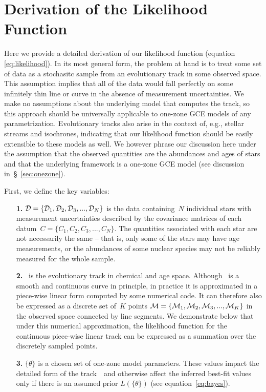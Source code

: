 \documentclass[ms.tex]{subfiles}
\begin{document}
\renewcommand\theequation{\thesection\arabic{equation}}
\renewcommand\thefigure{\thesection\arabic{figure}}
\setcounter{equation}{0}
\setcounter{figure}{0}

\section{Derivation of the Likelihood Function}
\label{sec:likelihood}

Here we provide a detailed derivation of our likelihood function (equation
\ref{eq:likelihood}).
In its most general form, the problem at hand is to treat some set of data as a
stochasitc sample from an evolutionary track in some observed space.
This assumption implies that all of the data would fall perfectly on some
infinitely thin line or curve in the absence of measurement uncertainties.
We make no assumptions about the underlying model that computes the track, so
this approach should be universally applicable to one-zone GCE models of any
parametrization.
Evolutionary tracks also arise in the context of, e.g., stellar streams and
isochrones, indicating that our likelihood function should be easily extensible
to these models as well.
We however phrase our discussion here under the assumption that the observed
quantities are the abundances and ages of stars and that the underlying
framework is a one-zone GCE model (see discussion in~\S~\ref{sec:onezone}).
\par
First, we define the key variables:
\begin{itemize}

	\item[\textbf{1.}] $\mathcal{D} = \{\mathcal{D}_1, \mathcal{D}_2,
	\mathcal{D}_3, ..., \mathcal{D}_N\}$ is the data containing~$N$ individual
	stars with measurement uncertainties described by the covariance matrices
	of each datum~$C = \{C_1, C_2, C_3, ..., C_N\}$.
	The quantities associated with each star are not necessarily the same --
	that is, only some of the stars may have age measurements, or the
	abundances of some nuclear species may not be reliably measured for the
	whole sample.

	\item[\textbf{2.}] ~is the evolutionary track in chemical and age
	space.
	Although~ is a smooth and continuous curve in principle, in
	practice it is approximated in a piece-wise linear form computed by some
	numerical code.
	It can therefore also be expressed as a discrete set of~$K$ points
	$\mathcal{M} = \{\mathcal{M}_1, \mathcal{M}_2, \mathcal{M}_3, ...,
	\mathcal{M}_K\}$ in the observed space connected by line segments.
	We demonstrate below that under this numerical approximation, the
	likelihood function for the continuous piece-wise linear track can be
	expressed as a summation over the discretely sampled points.

	\item[\textbf{3.}] $\{\theta\}$ is a chosen set of one-zone model
	parameters.
	These values impact the detailed form of the track~~and otherwise
	affect the inferred best-fit values only if there is an assumed prior
	$L(\{\theta\})$ (see equation~\ref{eq:bayes}).

\end{itemize}
\end{document}
